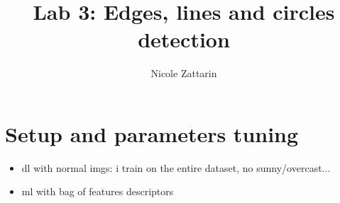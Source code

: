 \documentclass[twoside,onecolumn]{article}
\title{Lab 3: Edges, lines and circles detection } %
\author{Nicole Zattarin}
\date{}
\theoremstyle{definition}
\begin{document}
\maketitle

\begin{abstract}

\end{abstract}
\section{Setup and parameters tuning}
\begin{itemize}
\item dl with normal imgs: i train on the entire dataset, no sunny/overcast...
\item ml with bag of features descriptors
\end{itemize}
\end{document}

